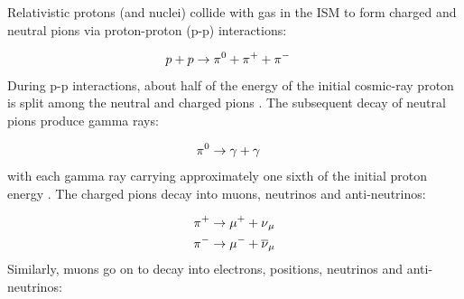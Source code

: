 Relativistic protons (and nuclei) collide with gas in the ISM to form charged and neutral pions via proton-proton (p-p) interactions:

\begin{equation}
    \begin{aligned}
    p+p&\rightarrow \pionneutral + \pionplus + \pionminus
    \end{aligned}
\end{equation}
\noindent During p-p interactions, about half of the energy of the initial cosmic-ray proton is split among the neutral and charged pions  \citep{2009ARA&A..47..523H}. The subsequent decay of neutral pions produce gamma rays:

\begin{equation}
    \begin{aligned}
    \pionneutral & \rightarrow \gamma +\gamma
    \end{aligned}
\end{equation}
\noindent with each gamma ray carrying approximately one sixth of the initial proton energy \citep{2009ARA&A..47..523H}. The charged pions decay into muons, neutrinos and anti-neutrinos:

\begin{equation}
    \begin{aligned}
    \pionplus &\rightarrow \muonplus + \muonneutrino \\
    \pionminus &\rightarrow \muonminus + \antimuonneutrino
    \end{aligned}
\end{equation}
\noindent Similarly, muons go on to decay into electrons, positions, neutrinos and anti-neutrinos:

